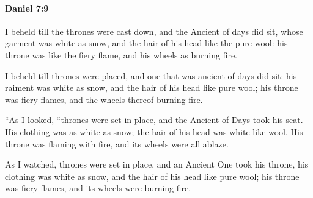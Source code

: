 		\paragraph{Daniel 7:9} %
			\label{DANIEL-7-9}

			I beheld till the thrones were cast down, and the Ancient of days did sit, whose garment was white as snow, and the hair of his head like the pure wool: his throne was like the fiery flame, and his wheels as burning fire.

			\begin{versebox}
					\item[BHS] 
					\item[LXX] 
					\item[ASV] I beheld till thrones were placed, and one that was ancient of days did sit: his raiment was white as snow, and the hair of his head like pure wool; his throne was fiery flames, and the wheels thereof burning fire.
					\item[NIV] “As I looked, “thrones were set in place, and the Ancient of Days took his seat. His clothing was as white as snow; the hair of his head was white like wool. His throne was flaming with fire, and its wheels were all ablaze.
					\item[NRSV] As I watched, thrones were set in place, and an Ancient One took his throne, his clothing was white as snow, and the hair of his head like pure wool; his throne was fiery flames, and its wheels were burning fire.
			\end{versebox}

